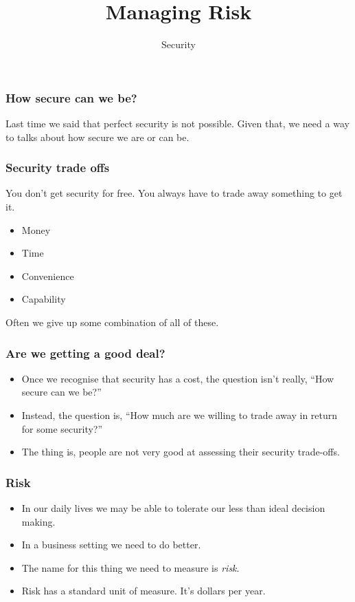 \documentclass[10pt]{beamer}
\title{Managing Risk}
\author[IN618]{Security}
\institute[Otago Polytechnic]{
  Otago Polytechnic \\
  Dunedin, New Zealand \\
}
\date{}
\begin{document}
\begin{frame}[plain]
  \titlepage
\end{frame}


\begin{frame}
	\frametitle{How secure can we be?}
	
	Last time we said that perfect security is not possible.
        Given that, we need a way to talks about how secure we are
        or can be.  

\end{frame}

\begin{frame}
	\frametitle{Security trade offs}

	You don't get security for free.  You always
	have to trade away something to get it.

	\begin{itemize}
		\item Money
		\item Time
		\item Convenience
		\item Capability
	\end{itemize}

	Often we give up some combination of all of these.
\end{frame}

\begin{frame}
	\frametitle{Are we getting a good deal?}

	\begin{itemize}
		\item Once we recognise that security has a cost,
			the question isn't really, ``How secure 
			can we be?''
		\item Instead, the question is, ``How much are
			we willing to trade away in return for 
			some security?''
		\item The thing is, people are not very good at 
			assessing their security trade-offs.
	\end{itemize}
\end{frame}

\begin{frame}
	\frametitle{Risk}

	\begin{itemize}
		\item In our daily lives we may be able to 
			tolerate our less than ideal decision making.
		\item In a business setting we need to do better.
		\item The name for this thing we need to measure is \emph{risk}.
		\item Risk has a standard unit of measure.  It's dollars per year.
	\end{itemize}
\end{frame}
\end{document}
